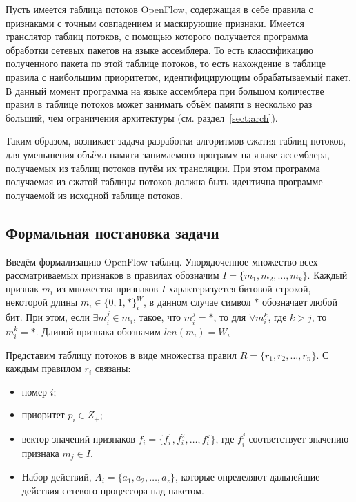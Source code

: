 \documentclass[oneside,final,12pt]{extarticle}
\begin{document}
    Пусть имеется таблица потоков OpenFlow, содержащая в себе правила с признаками с 
    точным совпадением и маскирующие признаки. Имеется транслятор таблиц потоков, с помощью которого
    получается программа обработки сетевых пакетов на языке ассемблера. То есть классификацию 
    полученного пакета по этой таблице потоков, то есть нахождение в таблице правила 
    с наибольшим приоритетом, идентифицирующим обрабатываемый пакет. В данный момент
    программа на языке ассемблера при большом количестве правил в таблице потоков может занимать
    объём памяти в несколько раз больший, чем ограничения архитектуры (см. раздел~\ref{sect:arch}).

    Таким образом, возникает задача разработки алгоритмов сжатия таблиц потоков,
    для уменьшения объёма памяти занимаемого программ на языке ассемблера, получаемых из
    таблиц потоков путём их трансляции. При этом программа получаемая из сжатой таблицы потоков 
    должна быть идентична программе получаемой из исходной таблице потоков.



    
    \subsection{Формальная постановка задачи}
        \label{sect:problem}
        Введём формализацию OpenFlow таблиц.
        Упорядоченное множество всех рассматриваемых признаков в правилах обозначим \(I=\{m_1,m_2,\ldots,m_k\}\). 
        Каждый признак \(m_i\) из множества признаков \(I\) характеризуется битовой строкой, некоторой длины \(m_i \in \{0, 1, *\}^W_i\),
        в данном случае символ \(*\) обозначает любой бит. При этом, если \(\exists m_i^j \in m_i\), такое, что 
        \( m_i^j = *\), то для \( \forall m_i^k \), где \(k > j\), то \( m_i^k = *\). Длиной признака обозначим \(len(m_i) = W_i\)

        Представим таблицу потоков в виде множества правил \(R=\{r_1,r_2,\ldots,r_n\}\). С каждым правилом \(r_i\) связаны:
        \begin{itemize}
            \item номер \(i\);
            \item приоритет \(p_i\in Z_+\);
            \item вектор значений признаков \(f_i=\{f_i^1,f_i^2,\ldots,f_i^k\}\), где \(f_i^j\) соответствует значению признака \(m_j\in I\). %
            \item Набор действий, \(A_i = \{a_1, a_2, \ldots, a_z\} \), которые определяют дальнейшие действия сетевого процессора над пакетом.
        \end{itemize}
\end{document}
